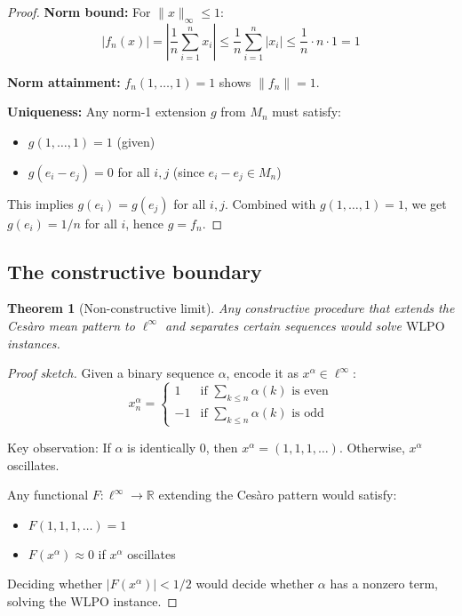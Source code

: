 \documentclass[11pt]{article}  %
\newtheorem{theorem}{Theorem}[section]
\newenvironment{thm}{\begin{theorem}}{\end{theorem}}
\newcommand{\R}{\mathbb{R}}
\newcommand{\linf}{\ell^\infty}
\newcommand{\WLPO}{\mathrm{WLPO}}
\begin{document}
\begin{proof}
\textbf{Norm bound:} For $\|x\|_\infty\le 1$:
\[
|f_n(x)| = \left|\frac{1}{n}\sum_{i=1}^n x_i\right| \le \frac{1}{n}\sum_{i=1}^n|x_i| \le \frac{1}{n}\cdot n\cdot 1 = 1
\]

\textbf{Norm attainment:} $f_n(1,\dots,1) = 1$ shows $\|f_n\|=1$.

\textbf{Uniqueness:} Any norm-1 extension $g$ from $M_n$ must satisfy:
\begin{itemize}
\item $g(1,\dots,1)=1$ (given)
\item $g(e_i-e_j)=0$ for all $i,j$ (since $e_i-e_j\in M_n$)
\end{itemize}
This implies $g(e_i)=g(e_j)$ for all $i,j$. Combined with $g(1,\dots,1)=1$, we get $g(e_i)=1/n$ for all $i$, hence $g=f_n$.
\end{proof}

\subsection{The constructive boundary}

\begin{thm}[Non-constructive limit]\label{thm:limit-nonconstructive}
Any constructive procedure that extends the Ces\`aro mean pattern to $\linf$ and separates certain sequences would solve $\WLPO$ instances.
\end{thm}

\begin{proof}[Proof sketch]
Given a binary sequence $\alpha$, encode it as $x^\alpha\in\linf$:
\[
x^\alpha_n = \begin{cases}
1 & \text{if } \sum_{k\le n}\alpha(k) \text{ is even}\\
-1 & \text{if } \sum_{k\le n}\alpha(k) \text{ is odd}
\end{cases}
\]

Key observation: If $\alpha$ is identically 0, then $x^\alpha=(1,1,1,\ldots)$. Otherwise, $x^\alpha$ oscillates.

Any functional $F:\linf\to\R$ extending the Ces\`aro pattern would satisfy:
\begin{itemize}
\item $F(1,1,1,\ldots)=1$
\item $F(x^\alpha)\approx 0$ if $x^\alpha$ oscillates
\end{itemize}

Deciding whether $|F(x^\alpha)|<1/2$ would decide whether $\alpha$ has a nonzero term, solving the $\WLPO$ instance.
\end{proof}
\end{document}

